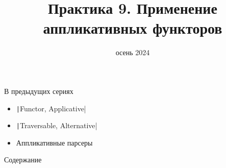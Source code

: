 
\newif\ifhandout




\title[9. Применение аппликативов]{Практика 9. Применение аппликативных функторов}
\date{осень 2024}



    \setcounter{framenumber}{-1}
    \maketitle

    \begin{frame}[fragile]{В предыдущих сериях}
        \begin{itemize}
            \item \texttt|Functor, Applicative|
            \item[\newtopic] \texttt|Traversable, Alternative|
            \item[\newtopic] Аппликативные парсеры
        \end{itemize}
    \end{frame}

    \begin{frame}[noframenumbering]{Содержание}
        \tableofcontents
    \end{frame}


